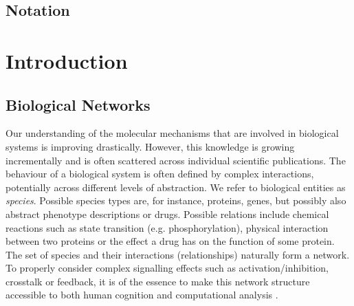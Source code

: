 \documentclass[
	fontsize=10pt, %
	twoside=false, %
	secnumdepth=1, %
]{kaobook}
\begin{document}
\listoftables %

\section{Notation}

\endgroup


\mainmatter %


\chapter{Introduction}
\blindtext

\section{Biological Networks}
Our understanding of the molecular mechanisms that are involved in biological
systems is improving drastically. However, this knowledge is growing
incrementally and is often scattered across individual scientific publications.
The behaviour of a biological system is often defined by complex interactions,
potentially across different levels of abstraction. We refer to biological
entities as \textit{species}. Possible species types are, for instance,
proteins, genes, but possibly also abstract phenotype descriptions or drugs.
%
Possible relations include chemical reactions such as state transition (e.g.
phosphorylation), physical interaction between two proteins or the effect a drug
has on the function of some protein.
%
The set of species and their interactions (relationships) naturally form a
network. To properly consider complex signalling effects such as
activation/inhibition, crosstalk or feedback, it is of the essence to make this
network structure accessible to both human cognition and computational analysis
\cite{barabasi_NetworkBiologyUnderstanding_2004}.
\end{document}
